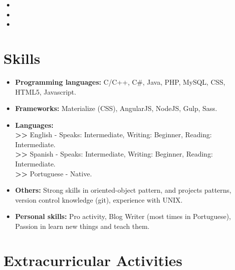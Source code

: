 \documentclass[11pt,a4paper,sans]{moderncv}        %
\begin{document}
\vspace{5pt}

\begin{itemize}

\item{}

\item{}

\item{}  

\end{itemize}
\section{Skills}

\vspace{6pt}

\begin{itemize}

\item \textbf{Programming languages:} C/C++, C\#, Java, PHP, MySQL, CSS, HTML5, Javascript.
\item \textbf{Frameworks:} Materialize (CSS), AngularJS, NodeJS, Gulp, Sass.
\item \textbf{Languages:}
\\\textbf{>>} English - Speaks: Intermediate, Writing: Beginner, Reading: Intermediate. 
\\\textbf{>>} Spanish - Speaks: Intermediate, Writing: Beginner, Reading: Intermediate. 
\\\textbf{>>} Portuguese - Native. 
\item \textbf{Others:} Strong skills in oriented-object pattern, and projects patterns, version control knowledge (git), experience with UNIX.
\item \textbf{Personal skills:} Pro activity, Blog Writer (most times in Portuguese), Passion in learn new things and teach them.
\end{itemize}

\vspace{2pt}

\section{Extracurricular Activities}
\end{document}
